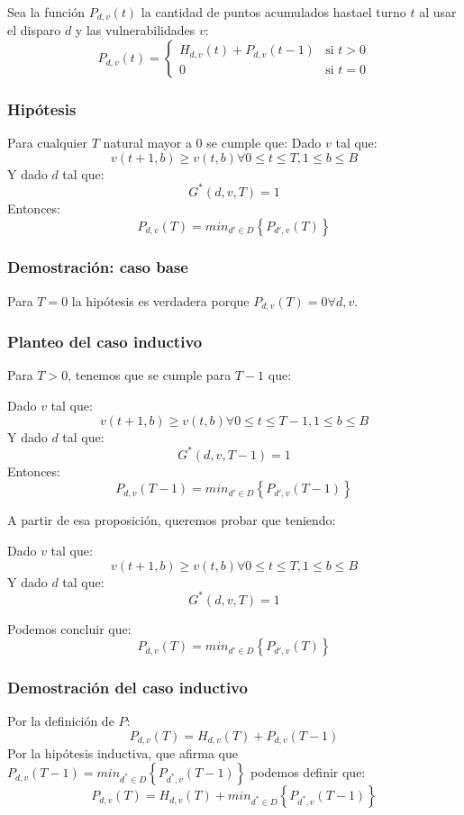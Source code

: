 \documentclass{article}
\begin{document}
Sea la función $P_{d,v}(t)$ la cantidad de puntos acumulados hastael turno $t$ al usar el disparo $d$ y las vulnerabilidades $v$:
\[
    P_{d,v}(t)=
    \begin{cases}
        H_{d,v}(t) + P_{d,v}(t-1) & \text{si $t>0$} \\
        0 & \text{si $t=0$}
    \end{cases}
\]


\subsubsection{Hipótesis}
\begin{framed}
Para cualquier $T$ natural mayor a 0 se cumple que: \newline
Dado $v$ tal que: 
$$ v(t+1,b) 
\geq 
v(t,b) \forall 0 \leq t \leq T, 1 \leq b \leq B $$
Y dado $d$ tal que: $$G^*(d,v,T)=1$$
Entonces: $$P_{d,v}(T)=min_{d' \in D} \left \{ P_{d',v}(T) \right \}$$
\end{framed}

\subsubsection{Demostración: caso base}
Para $T=0$ la hipótesis es verdadera porque $P_{d,v}(T)=0 \forall d,v$.


\subsubsection{Planteo del caso inductivo}
Para $T > 0$, tenemos que se cumple para $T-1$ que:
\begin{framed}
Dado $v$ tal que: $$ v(t+1,b) \geq v(t,b) \forall 0 \leq t \leq T-1, 1 \leq b \leq B $$
Y dado $d$ tal que: $$G^*(d,v,T-1)=1$$
Entonces: $$P_{d,v}(T-1)=min_{d' \in D} \left \{ P_{d',v}(T-1) \right \}$$
\end{framed}
A partir de esa proposición, queremos probar que teniendo:
\begin{framed}
Dado $v$ tal que: $$ v(t+1,b) \geq v(t,b) \forall 0 \leq t \leq T, 1 \leq b \leq B $$
Y dado $d$ tal que: $$G^*(d,v,T)=1$$
\end{framed}
Podemos concluir que: $$P_{d,v}(T)=min_{d' \in D} \left \{ P_{d',v}(T) \right \}$$

\subsubsection{Demostración del caso inductivo}
Por la definición de $P$: $$P_{d,v}(T)=H_{d,v}(T)+P_{d,v}(T-1)$$
Por la hipótesis inductiva, que afirma que $P_{d,v}(T-1)=min_{d^* \in D}\left \{ P_{d^*,v}(T-1) \right \}$ podemos definir que:
$$P_{d,v}(T)=H_{d,v}(T)+min_{d^* \in D}\left \{ P_{d^*,v}(T-1) \right \}$$
\end{document}
